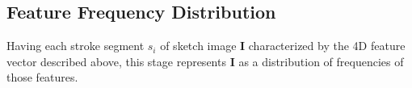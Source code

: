 %


\vspace{-4mm}
\subsection{Feature Frequency Distribution} \label{subsec: featureExtraction}\vspace{-2mm}
Having each stroke segment $s_i$ of sketch image $\mathbf{I}$ characterized by the 4D feature vector described above,
this stage represents $\mathbf{I}$ as a distribution of frequencies of those features.


